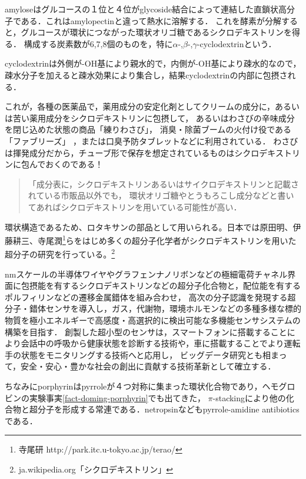 \documentclass[uplatex, dvipdfmx]{jsreport}
\begin{document}
\begin{definition}[CD: Cyclodextrin]
    amyloseはグルコースの１位と４位がglycoside結合によって連結した直鎖状高分子である．これはamylopectinと違って熱水に溶解する．
    これを酵素が分解すると，グルコースが環状につながった環状オリゴ糖であるシクロデキストリンを得る．
    構成する炭素数が6,7,8個のものを，特に$\alpha$-,$\beta$-,$\gamma$-cyclodextrinという．
\end{definition}
\begin{example}
    cyclodextrinは外側が-OH基により親水的で，内側が-OH基により疎水的なので，疎水分子を加えると疎水効果により集合し，結果cyclodextrinの内部に包摂される．

    これが，各種の医薬品で，薬用成分の安定化剤としてクリームの成分に，あるいは苦い薬用成分をシクロデキストリンに包摂して，
    あるいはわさびの辛味成分を閉じ込めた状態の商品「練りわさび」，
    消臭・除菌ブームの火付け役である「ファブリーズ」
    ，または口臭予防タブレットなどに利用されている\cite{有賀克彦}．
    わさびは揮発成分だから，チューブ形で保存を想定されているものはシクロデキストリンに包んでおくのである！
    \begin{quote}
        「成分表に，シクロデキストリンあるいはサイクロデキストリンと記載されている市販品以外でも，
        環状オリゴ糖やとうもろこし成分などと書いてあればシクロデキストリンを用いている可能性が高い．
    \end{quote}
\end{example}
\begin{remark}
    環状構造であるため、ロタキサンの部品として用いられる。日本では原田明、伊藤耕三、寺尾潤\footnote{寺尾研 http://park.itc.u-tokyo.ac.jp/terao/}らをはじめ多くの超分子化学者がシクロデキストリンを用いた超分子の研究を行っている。\footnote{ja.wikipedia.org「シクロデキストリン」}
\end{remark}
\begin{application}[寺尾研とシクロデキストリン]
    nmスケールの半導体ワイヤやグラフェンナノリボンなどの極細電荷チャネル界面に包摂能を有するシクロデキストリンなどの超分子化合物と，配位能を有するポルフィリンなどの遷移金属錯体を組み合わせ，
    高次の分子認識を発現する超分子・錯体センサを導入し，ガス，代謝物，環境ホルモンなどの多種多様な標的物質を極小エネルギーで高感度・高選択的に検出可能な多機能センサシステムの構築を目指す．
    創製した超小型のセンサは，スマートフォンに搭載することにより会話中の呼吸から健康状態を診断する技術や，車に搭載することでより運転手の状態をモニタリングする技術へと応用し，
    ビッグデータ研究とも相まって，安全・安心・豊かな社会の創出に貢献する技術革新として確立する．

    ちなみにporphyrinはpyrroleが４つ対称に集まった環状化合物であり，ヘモグロビンの実験事実\ref{fact-doming-porphyrin}でも出てきた，
    $\pi$-stackingにより他の化合物と超分子を形成する常連である．netropsinなどもpyrrole-amidine antibioticsである．
\end{application}
\end{document}
